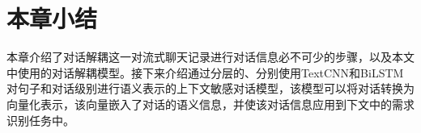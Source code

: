 

\section{本章小结}

本章介绍了对话解耦这一对流式聊天记录进行对话信息必不可少的步骤，以及本文中使用的对话解耦模型。接下来介绍通过分层的、分别使用TextCNN和BiLSTM对句子和对话级别进行语义表示的上下文敏感对话模型{\dm}，该模型可以将对话转换为向量化表示，该向量嵌入了对话的语义信息，并使该对话信息应用到下文中的需求识别任务中。
